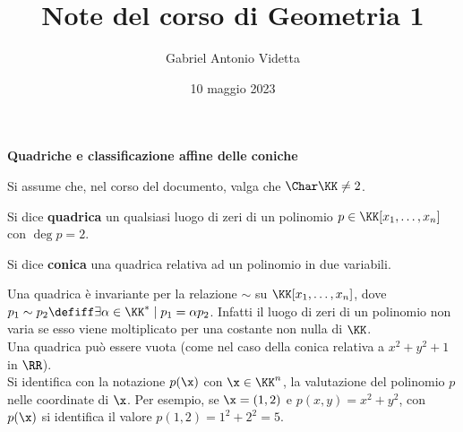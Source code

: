 \documentclass[11pt]{article}
\title{\textbf{Note del corso di Geometria 1}}
\author{Gabriel Antonio Videtta}
\date{10 maggio 2023}
\begin{document}
	
	\maketitle
	
	\begin{center}
		\Large \textbf{Quadriche e classificazione affine delle coniche}
	\end{center}
	
	\wip
	
	\begin{note}
		Si assume che, nel corso del documento, valga che $\Char \KK \neq 2$.
	\end{note}
	
	\begin{definition} [quadriche] Si dice \textbf{quadrica} un qualsiasi luogo di zeri
		di un polinomio $p \in \KK[x_1, \ldots, x_n]$ con $\deg p = 2$.
	\end{definition}
	
	\begin{definition} [coniche] Si dice \textbf{conica} una quadrica relativa ad un polinomio
		in due variabili.
	\end{definition}
	
	\begin{remark}\nl
		\li Una quadrica è invariante per la relazione $\sim$ su $\KK[x_1, \ldots, x_n]$, dove
		$p_1 \sim p_2 \defiff \exists \alpha \in \KK^* \mid p_1 = \alpha p_2$. Infatti
		il luogo di zeri di un polinomio non varia se esso viene moltiplicato per una costante non nulla di $\KK$. \\
		\li Una quadrica può essere vuota (come nel caso della conica relativa a $x^2 + y^2 + 1$ in $\RR$). \\
		\li Si identifica con la notazione $p(\x)$ con $\x \in \KK^n$, la valutazione del polinomio $p$ nelle coordinate
		di $\x$. Per esempio, se $\x = (1, 2)$ e $p(x, y) = x^2 + y^2$, con $p(\x)$ si identifica il valore
		$p(1, 2) = 1^2 + 2^2 = 5$.
	\end{remark}
	
\end{document}
